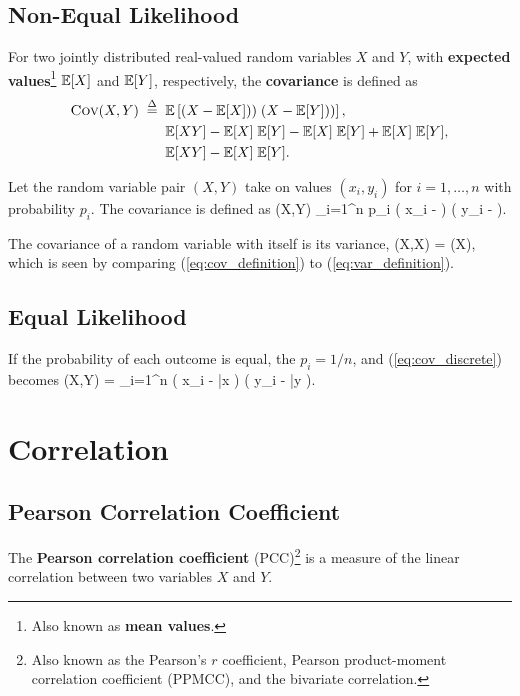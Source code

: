 \subsection{Non-Equal Likelihood}

For two jointly distributed real-valued random variables $X$ and $Y$, with
{\bf expected values}\footnote{Also known as {\bf mean values}.} 
$\mathbb{E}[X]$ and $\mathbb{E}[Y]$, respectively, the {\bf covariance} is defined as
\begin{align}
\mbox{\sc Cov}(X,Y) \; \stackrel{\Delta}{=} \; & \; \mathbb{E}\left[ 
(X - \mathbb{E}[X])) \; (X - \mathbb{E}[Y]))
\right], \label{eq:cov_definition} \\
 & \; \mathbb{E}[XY] - \mathbb{E}[X] \; \mathbb{E}[Y] - \mathbb{E}[X] \; \mathbb{E}[Y] + \mathbb{E}[X] \; \mathbb{E}[Y], \nonumber \\
 & \; \mathbb{E}[XY] - \mathbb{E}[X] \; \mathbb{E}[Y].
\end{align}

Let the random variable pair $(X,Y)$ take on values $(x_i, y_i)$ for
$i=1,\ldots,n$ with probability $p_i$.  The covariance is defined as
\be
\cov(X,Y)  \sum_{i=1}^n \; p_i \; \left(
x_i - \ex
\right)
\;
\left(
y_i - \ey
\right).
\label{eq:cov_discrete}
\ee

\begin{Hremark}
The covariance of a random variable with itself is its 
variance, 
\be
\cov(X,X) = \var(X), 
\ee
which is seen by comparing 
(\ref{eq:cov_definition})
to 
(\ref{eq:var_definition}).
\end{Hremark}

\subsection{Equal Likelihood}
If the probability of each outcome is equal, the $p_i = 1/n$, and
(\ref{eq:cov_discrete}) becomes
\be
\cov(X,Y) =  \; \sum_{i=1}^n \; \left(
x_i - \bar{x}
\right)
\;
\left(
y_i - \bar{y}
\right).
\label{eq:cov_discrete_equal}
\ee

\section{Correlation}

\subsection{Pearson Correlation Coefficient}
The {\bf Pearson correlation coefficient} (PCC)\footnote{Also known as the
Pearson's $r$ coefficient, Pearson product-moment correlation
coefficient (PPMCC), and the bivariate correlation.} is a 
measure of the linear correlation between two variables 
$X$ and $Y$.  

